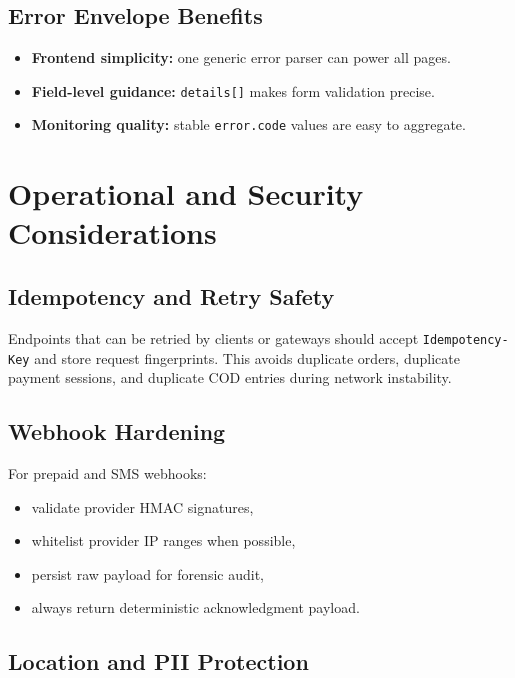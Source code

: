 \subsection{Error Envelope Benefits}

\begin{itemize}
		\item \textbf{Frontend simplicity:} one generic error parser can power all pages.
		\item \textbf{Field-level guidance:} \texttt{details[]} makes form validation precise.
		\item \textbf{Monitoring quality:} stable \texttt{error.code} values are easy to aggregate.
\end{itemize}

\section{Operational and Security Considerations}

\subsection{Idempotency and Retry Safety}

Endpoints that can be retried by clients or gateways should accept
\texttt{Idempotency-Key} and store request fingerprints. This avoids duplicate
orders, duplicate payment sessions, and duplicate COD entries during network
instability.

\subsection{Webhook Hardening}

For prepaid and SMS webhooks:
\begin{itemize}
		\item validate provider HMAC signatures,
		\item whitelist provider IP ranges when possible,
		\item persist raw payload for forensic audit,
		\item always return deterministic acknowledgment payload.
\end{itemize}

\subsection{Location and PII Protection}


